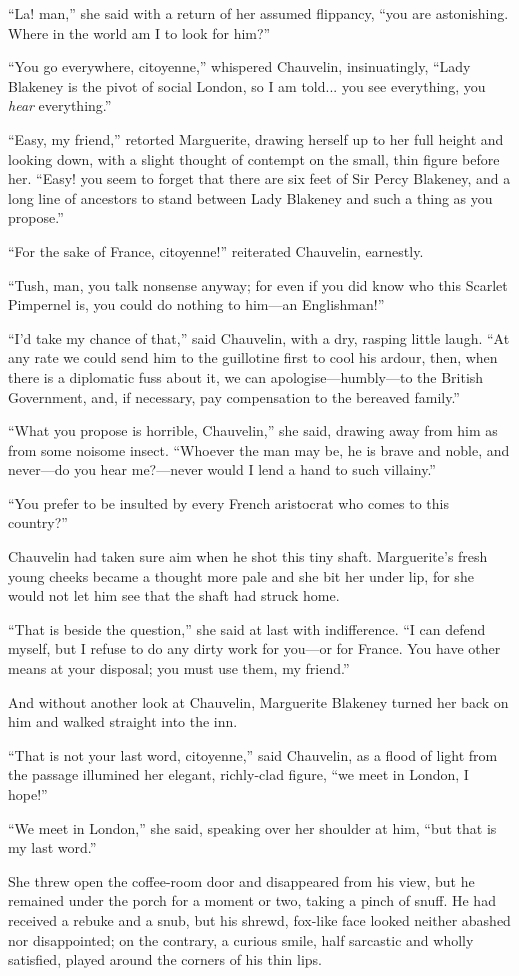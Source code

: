 \enquote{La! man,} she said with a return of her assumed flippancy, \enquote{you are astonishing. Where in the world am I to look for him?}

\enquote{You go everywhere, citoyenne,} whispered Chauvelin, insinuatingly, \enquote{Lady Blakeney is the pivot of social London, so I am told... you see everything, you \textit{hear} everything.}

\enquote{Easy, my friend,} retorted Marguerite, drawing herself up to her full height and looking down, with a slight thought of contempt on the small, thin figure before her. \enquote{Easy! you seem to forget that there are six feet of Sir Percy Blakeney, and a long line of ancestors to stand between Lady Blakeney and such a thing as you propose.}

\enquote{For the sake of France, citoyenne!} reiterated Chauvelin, earnestly.

\enquote{Tush, man, you talk nonsense anyway; for even if you did know who this Scarlet Pimpernel is, you could do nothing to him---an Englishman!}

\enquote{I'd take my chance of that,} said Chauvelin, with a dry, rasping little laugh. \enquote{At any rate we could send him to the guillotine first to cool his ardour, then, when there is a diplomatic fuss about it, we can apologise---humbly---to the British Government, and, if necessary, pay compensation to the bereaved family.}

\enquote{What you propose is horrible, Chauvelin,} she said, drawing away from him as from some noisome insect. \enquote{Whoever the man may be, he is brave and noble, and never---do you hear me?---never would I lend a hand to such villainy.}

\enquote{You prefer to be insulted by every French aristocrat who comes to this country?}

Chauvelin had taken sure aim when he shot this tiny shaft. Marguerite's fresh young cheeks became a thought more pale and she bit her under lip, for she would not let him see that the shaft had struck home.

\enquote{That is beside the question,} she said at last with indifference. \enquote{I can defend myself, but I refuse to do any dirty work for you---or for France. You have other means at your disposal; you must use them, my friend.}

And without another look at Chauvelin, Marguerite Blakeney turned her back on him and walked straight into the inn.

\enquote{That is not your last word, citoyenne,} said Chauvelin, as a flood of light from the passage illumined her elegant, richly-clad figure, \enquote{we meet in London, I hope!}

\enquote{We meet in London,} she said, speaking over her shoulder at him, \enquote{but that is my last word.}

She threw open the coffee-room door and disappeared from his view, but he remained under the porch for a moment or two, taking a pinch of snuff. He had received a rebuke and a snub, but his shrewd, fox-like face looked neither abashed nor disappointed; on the contrary, a curious smile, half sarcastic and wholly satisfied, played around the corners of his thin lips.